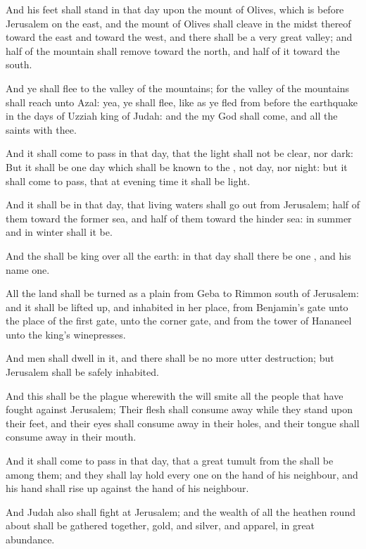 \Verse And his feet shall stand in that day upon the mount of Olives, which is before Jerusalem on the east, and the mount of Olives shall cleave in the midst thereof toward the east and toward the west, and there shall be a very great valley; and half of the mountain shall remove toward the north, and half of it toward the south.

\Verse And ye shall flee to the valley of the mountains; for the valley of the mountains shall reach unto Azal: yea, ye shall flee, like as ye fled from before the earthquake in the days of Uzziah king of Judah: and the \LORD my God shall come, and all the saints with thee.

\Verse And it shall come to pass in that day, that the light shall not be clear, nor dark: \Verse But it shall be one day which shall be known to the \LORD, not day, nor night: but it shall come to pass, that at evening time it shall be light.

\Verse And it shall be in that day, that living waters shall go out from Jerusalem; half of them toward the former sea, and half of them toward the hinder sea: in summer and in winter shall it be.

\Verse And the \LORD shall be king over all the earth: in that day shall there be one \LORD, and his name one.

\Verse All the land shall be turned as a plain from Geba to Rimmon south of Jerusalem: and it shall be lifted up, and inhabited in her place, from Benjamin's gate unto the place of the first gate, unto the corner gate, and from the tower of Hananeel unto the king's winepresses.

\Verse And men shall dwell in it, and there shall be no more utter destruction; but Jerusalem shall be safely inhabited.

\Verse And this shall be the plague wherewith the \LORD will smite all the people that have fought against Jerusalem; Their flesh shall consume away while they stand upon their feet, and their eyes shall consume away in their holes, and their tongue shall consume away in their mouth.

\Verse And it shall come to pass in that day, that a great tumult from the \LORD shall be among them; and they shall lay hold every one on the hand of his neighbour, and his hand shall rise up against the hand of his neighbour.

\Verse And Judah also shall fight at Jerusalem; and the wealth of all the heathen round about shall be gathered together, gold, and silver, and apparel, in great abundance.

